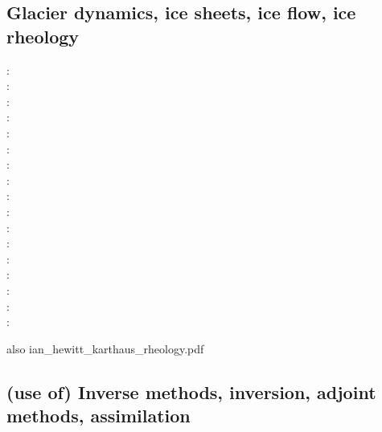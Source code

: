 \subsection{Glacier dynamics, ice sheets, ice flow, ice rheology}

\begin{scriptsize}
\nineteeneightynine: \cite{buja89}\\
\nineteenninety: \cite{vawh90}\\
\nineteenninetyfour: \cite{wizh94}\\
\nineteenninetyseven: \cite{grev97}\\
\twothousandone: \cite{goko01}\\
\twothousandfour: \cite{frmm04}\\
\twothousandsix: \cite{asbl06}\cite{frmm06}\\
\twothousandseven: \cite{susp07}\cite{zwgg07}\\
\twothousandeleven: \cite{zhjg11}\\
\twothousandtwelve: \cite{pode12}\\
\twothousandthirteen: \cite{raab13}\\
\twothousandfourteen: \cite{lejx14}\cite{moad14}\\
\twothousandfifteen: \cite{issg15}\cite{frlg15}\\
\twothousandsixteen: \cite{krab16}\cite{daws16}\\
\twothousandseventeen: \cite{lolc17}\cite{gors17}\\
\twothousandeighteen: \cite{heah18}\cite{mimr18}\\
\twothousandnineteen: \cite{kudd19}\cite{kuwd19}\cite{kuiper19}
\end{scriptsize}


also ian\_hewitt\_karthaus\_rheology.pdf

\subsection{(use of) Inverse methods, inversion, adjoint methods, assimilation}

